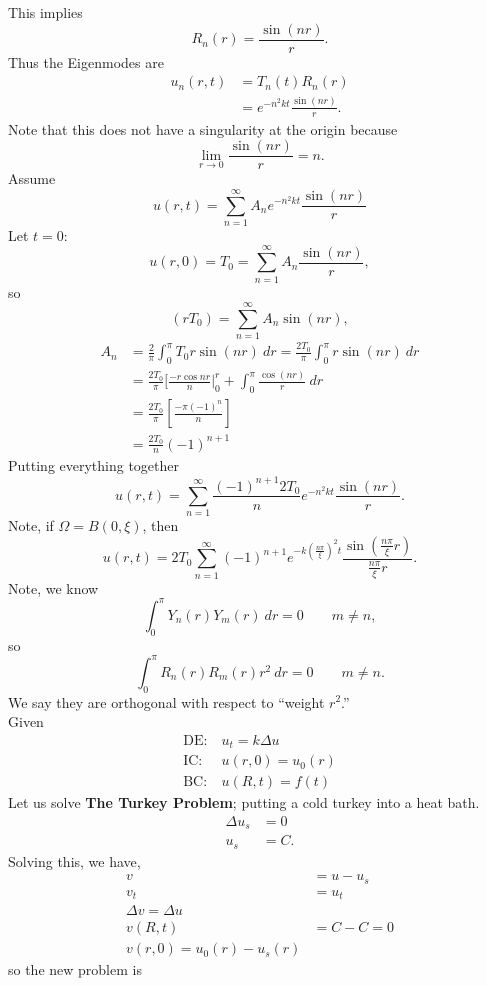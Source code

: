 \documentclass[cm]{article}
\begin{document}
This implies
$$R_n(r) = \frac{\sin(nr)}{r}.$$
Thus the Eigenmodes are
\begin{align*}
u_n(r,t) &= T_n(t) R_n(r) \\
    &= e^{-n^2 k t } \frac{\sin(nr)}{r}.
\end{align*}
Note that this does not have a singularity at the origin because
$$ \lim_{r \to 0} \frac{\sin(nr)}{r} = n.$$ Assume
$$u(r,t) = \sum_{n = 1}^{\infty} A_n e^{-n^2 k t} \frac{\sin(nr)}{r}$$
Let $t = 0$:
$$u(r,0) = T_0 = \sum_{n = 1}^{\infty} A_n \frac{\sin(nr)}{r},$$
so
$$(r T_0) = \sum_{n = 1}^{\infty} A_n \sin(nr),$$
\begin{align*}
A_n &= \frac{2}{\pi} \int_0^\pi T_0 r \sin(nr)~dr = \frac{2 T_0}{\pi}
\int_0^\pi r \sin(nr)~dr \\
&= \frac{2 T_0}{\pi} [ \frac{- r \cos n r}{n}\Big|_0^r + \int_0^\pi \frac{
    \cos(nr)}{r} ~ dr \\
&= \frac{2 T_0}{\pi} \left[ \frac{-\pi (-1)^n}{n} \right] \\
&= \frac{2 T_0}{n} (-1)^{n+1}
\end{align*}
Putting everything together
$$u(r,t) = \sum_{n = 1}^{\infty} \frac{(-1)^{n+1} 2 T_0}{n} e^{-n^2 k t}
\frac{\sin(nr)}{r}.$$
Note, if $\Omega = B(0,\xi)$, then
$$u(r,t) = 2 T_0 \sum_{n=1}^{\infty} (-1)^{n+1} e^{-k (\frac{n \pi}{\xi})^2 t}
\frac{\sin(\frac{n \pi}{\xi} r)}{\frac{n \pi}{\xi} r}.$$
Note, we know
$$\int_0^\pi Y_n(r) Y_m(r)~dr = 0 \qquad m \neq n,$$
so
$$\int_0^\pi R_n(r) R_m(r) r^2~dr = 0 \qquad m \neq n.$$
We say they are orthogonal with respect to ``weight $r^2$.'' \\
Given
\begin{align*}
\text{DE:}&~ u_t = k \Delta u \\
\text{IC:}&~ u(r,0) = u_0(r) \\
\text{BC:}&~ u(R,t) = f(t)
\end{align*}
Let us solve {\bf The Turkey Problem}; putting a cold turkey into a heat bath.
\begin{align*}
\Delta u_s &= 0\\
u_s &= C.
\end{align*}
Solving this, we have,
\begin{align*}
v &= u - u_s \\
v_t &= u_t \\
\Delta v = \Delta u \\
v(R,t) &= C - C = 0 \\
v(r,0) = u_0(r) - u_s(r)
\end{align*}
so the new problem is
\end{document}
